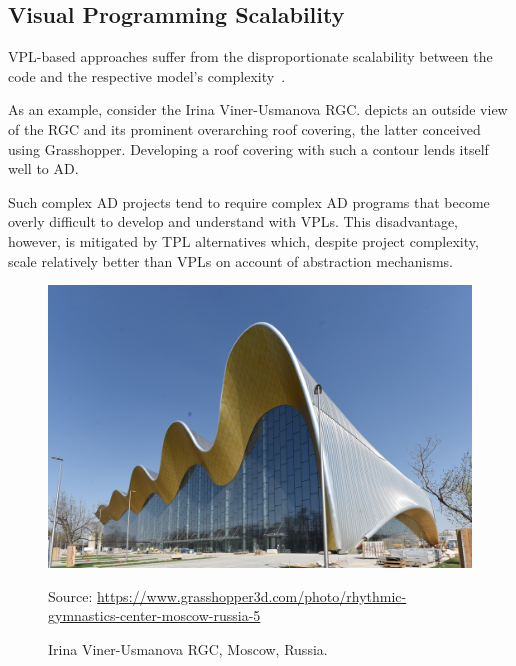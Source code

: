 \subsection{Visual Programming Scalability}%
\label{sec:related.ad.vpl-scalability}

\Ac{VPL}-based approaches suffer from the disproportionate scalability between
the code and the respective model's complexity~\cite{Leitao:2013:PESLGD}.

As an example, consider the Irina Viner-Usmanova \ac{RGC}.
 depicts an outside view of the
\ac{RGC} and its prominent overarching roof covering, the latter conceived using
Grasshopper.  Developing a roof covering with such a contour lends itself well
to \ac{AD}.

Such complex \ac{AD} projects tend to require complex \ac{AD} programs that
become overly difficult to develop and understand with \acp{VPL}.  This
disadvantage, however, is mitigated by \ac{TPL} alternatives which, despite
project complexity, scale relatively better than \acp{VPL} on account of
abstraction mechanisms.

\begin{figure}[htbp]
  \includegraphics[width=\linewidth]{fig/rgc}
  \begin{minipage}{\linewidth}
  \scriptsize Source:
  \url{https://www.grasshopper3d.com/photo/rhythmic-gymnastics-center-moscow-russia-5}
  \end{minipage}
  \caption{\label{fig:related.ad.vpl-scalability.rgc}
    Irina Viner-Usmanova \ac{RGC}, Moscow, Russia.}%
\end{figure}
